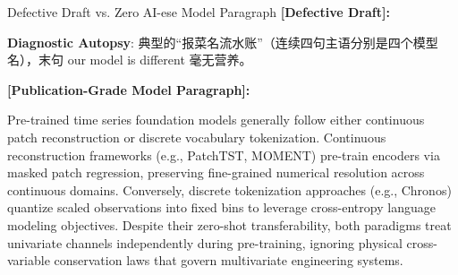 \begin{ExampleBox}{Defective Draft vs. Zero AI-ese Model Paragraph}
\textbf{\color{TargetHighlight}[Defective Draft]:}\par
{}\par\vspace{4pt}
\textbf{Diagnostic Autopsy}: 典型的“报菜名流水账”（连续四句主语分别是四个模型名），末句 our model is different 毫无营养。\par\vspace{6pt}
\textbf{\color{AcadNavy}[Publication-Grade Model Paragraph]:}\par
Pre-trained time series foundation models generally follow either continuous patch reconstruction or discrete vocabulary tokenization. Continuous reconstruction frameworks (e.g., PatchTST, MOMENT) pre-train encoders via masked patch regression, preserving fine-grained numerical resolution across continuous domains. Conversely, discrete tokenization approaches (e.g., Chronos) quantize scaled observations into fixed bins to leverage cross-entropy language modeling objectives. Despite their zero-shot transferability, both paradigms treat univariate channels independently during pre-training, ignoring physical cross-variable conservation laws that govern multivariate engineering systems.
\end{ExampleBox}
